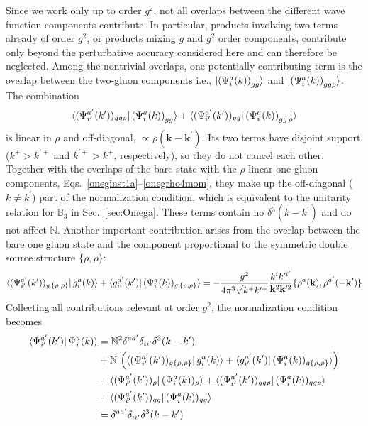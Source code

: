 \documentclass[a4paper,11pt]{article}
\def\v#1{\mathbf{#1}}
\def\mf#1{\mathbb{#1}}
\begin{document}
Since we work only up to order $g^{2}$, not all overlaps between the different wave function components contribute. In particular, products involving two terms already of order $g^{2}$, or products mixing $g$ and $g^{2}$ order components, contribute only beyond the perturbative accuracy considered here and can therefore be neglected. Among the nontrivial overlaps, one potentially contributing term is the overlap between the two-gluon components i.e., $\ket{ \left(\Psi^{a}_{i}(k) \right)_{gg} }$  and  $\ket{ \left(\Psi^{a}_{i}(k) \right)_{gg\rho} }$. {\color{chg}The combination
\begin{align}
    \bra{ (\Psi^{a'}_{i'}(k'))_{gg\rho} }
{ \left(\Psi^{a}_{i}(k) \right)_{gg} }\rangle + 
\bra{ (\Psi^{a'}_{i'}(k') )_{gg} }
{ \left(\Psi^{a}_{i}(k) \right)_{gg\,\rho} }\rangle  
\end{align}
is linear in $\rho$ and off-diagonal, $\propto\rho(\v{k}-\v{k}^{\prime})$. Its two terms have disjoint support ($k^{+}>k^{\prime+}$ and $k^{\prime+}>k^{+}$, respectively), so they do not cancel each other. Together with the overlaps of the bare state with the $\rho$-linear one-gluon components, Eqs.~\eqref{oneginst1a}--\eqref{onegrho4mom}, they make up the off-diagonal ($k\neq k^{\prime}$) part of the normalization condition, which is equivalent to the unitarity relation for $\mf{B}_{3}$ in Sec.~\ref{sec:Omega}. These terms contain no $\delta^{3}(k-k^{\prime})$ and do not affect $\mf{N}$.} Another important contribution arises from the overlap between the bare one gluon state and the component proportional to the symmetric double source structure $\{\rho,\rho\}$:
\begin{align}
  \bra{(\Psi^{a^{\prime}}_{i^{\prime}}(k^{\prime}))_{g\, \{\rho,\rho\} } }  
 g^{a}_{i}(k) \rangle + 
\bra{ g^{a^{\prime}}_{i^{\prime}}(k^{\prime}) }  
   (\Psi^{a}_{i}(k))_{g\, \{\rho,\rho\}}  \rangle  = 
   - \frac{g^2}{4\pi^3 \sqrt{k^+ k^{\prime +}}} 
 \frac{k^{i} k^{\prime i^{\prime}}}{\v{k}^2 \v{k}^{\prime 2}} 
 \{\rho^{a}(\v{k}),\rho^{a^{\prime}}(-\v{k}^{\prime}) \}
\end{align}
Collecting all contributions relevant at order $g^{2}$, the normalization condition becomes
\begin{align}
  \bra{\Psi^{a'}_{i'}(k')}
  {\Psi^{a}_{i}(k)} \rangle
  & = \mf{N}^2 \delta^{a a'} \delta_{i i'} \delta^{3}(k-k') 
  \notag \\ & 
  + \mf{N}\,\left( \bra{ (\Psi^{a'}_{i'}(k'))_{g \{\rho,\rho\} } }  
    g^{a}_{i}(k) \rangle + 
    \bra{ g^{a'}_{i'}(k') }  
  (\Psi^{a}_{i}(k))_{g \{\rho,\rho\}}  \rangle \right) \\ \notag   
            & +  \bra{ (\Psi^{a'}_{i'}(k') )_{\rho} } (\Psi^{a}_{i}(k) )_{\rho}\rangle     
            +  \bra{ (\Psi^{a'}_{i'}(k') )_{gg\rho} } (\Psi^{a}_{i}(k) )_{gg\rho}\rangle     
           \notag \\ &  +  \bra{ (\Psi^{a'}_{i'}(k') )_{gg} } (\Psi^{a}_{i}(k) )_{gg}\rangle     
  \notag \\ &  = \delta^{a a'} \delta_{i i'} \delta^{3}(k-k') 
\end{align}
\end{document}
